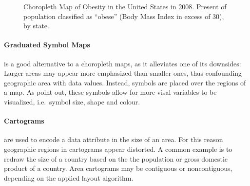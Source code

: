 \begin{figure}[h]
  \centering
  \caption{%
    Choropleth Map of Obesity in the United States in 2008.
    Present of population classified as ``obese'' (Body Mass Index in excess of 30), by state.
  }\label{fig:theory:choropleth}
\end{figure}

\paragraph{Graduated Symbol Maps} is a good alternative to a choropleth maps, as it alleviates one of its downsides:
Larger areas may appear more emphasized than smaller ones, thus confounding geographic area with data values.
Instead, symbols are placed over the regions of a map.
As \textcite{Heer2010} point out, these symbols allow for more visal variables to be visualized, i.e.\  symbol size, shape and colour.

\paragraph{Cartograms} are used to encode a data attribute in the size of an area.
For this reason geographic regions in cartograms appear distorted.
A common example is to redraw the size of a country based on the the population or gross domestic product of a country.
Area cartograms may be contiguous or noncontiguous, depending on the applied layout algorithm.

